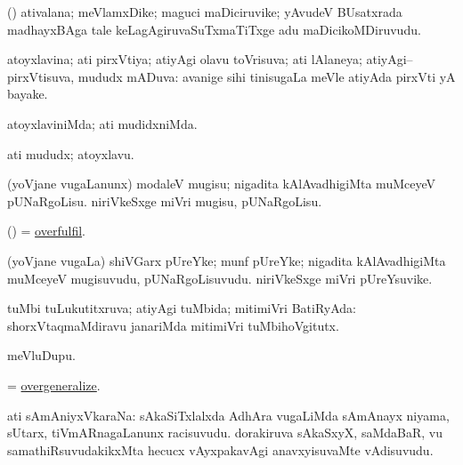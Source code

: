 \bentry
{}
\gl{\nA}
\bmng
(\BUvi) ativalana; meVlamxDike; maguci maDiciruvike; yAvudeV BUsatxrada madhayxBAga tale keLagAgiruvaSuTxmaTiTxge adu maDicikoMDiruvudu. 
\emng
\eentry


\bentry
{}
\gl{\gu}
\bmng
atoyxlavina; ati pirxVtiya; atiyAgi olavu toVrisuva; ati lAlaneya; atiyAgi--pirxVtisuva, mududx mADuva:  avanige sihi tinisugaLa meVle atiyAda pirxVti yA bayake. 
\emng
\eentry


\bentry
{}
\gl{\kirxvi}
\bmng
atoyxlaviniMda; ati mudidxniMda. 
\emng
\eentry


\bentry
{}
\gl{\nA}
\bmng
ati mududx; atoyxlavu. 
\emng
\eentry


\bentry
{}
\gl{\sakirx}
\bmng
(yoVjane \mo vugaLanunx) 
\banum
{} modaleV mugisu; nigadita kAlAvadhigiMta muMceyeV pUNaRgoLisu. 
 niriVkeSxge miVri mugisu, pUNaRgoLisu. 
\eanum
\emng
\eentry


\bentry
{}
\gl{\sakirx}
\bmng
(\ame) = \hyperlink{overfulfil}{overfulfil}. 
\emng
\eentry


\bentry
{}
\gl{\nA}
\bmng
(yoVjane \mo vugaLa) 
\banum
{} shiVGarx pUreYke; munf pUreYke; nigadita kAlAvadhigiMta muMceyeV mugisuvudu, pUNaRgoLisuvudu. 
 niriVkeSxge miVri pUreYsuvike. 
\eanum
\emng
\eentry

\bentry
{}
\gl{\gu}
\bmng
tuMbi tuLukutitxruva; atiyAgi tuMbida; mitimiVri BatiRyAda:  shorxVtaqmaMdiravu janariMda mitimiVri tuMbihoVgitutx. 
\emng
\eentry

\bentry
{}
\gl{\nA}
\bmng
meVluDupu. 
\emng
\eentry

\bentry
{}
\gl{\kirx}
\bmng
= \hyperlink{overgeneralize}{overgeneralize}. 
\emng
\eentry

\bentry
{}
\gl{\nA}
\bmng
ati sAmAniyxVkaraNa: 
\banum
{} sAkaSiTxlalxda AdhAra \mo vugaLiMda sAmAnayx niyama, sUtarx, tiVmARnagaLanunx racisuvudu. 
 dorakiruva sAkaSxyX, saMdaBaR, \mo vu samathiRsuvudakikxMta hecucx vAyxpakavAgi anavxyisuvaMte vAdisuvudu. 
\eanum
\emng
\eentry

